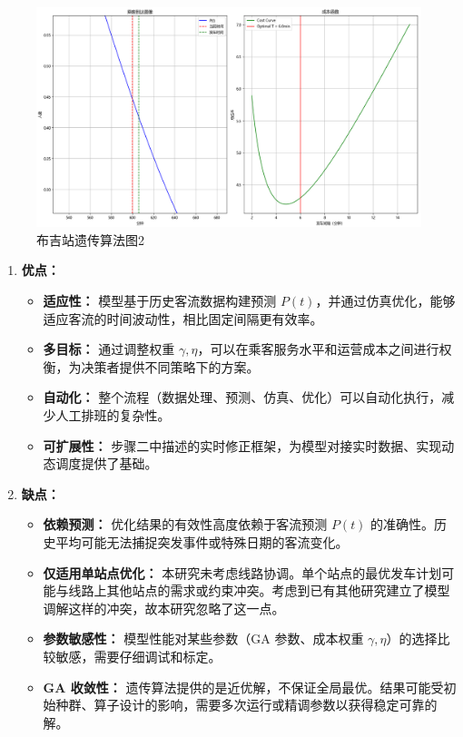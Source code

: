 \begin{figure}[htbp]
    \centering
    \includegraphics[width=1.0\textwidth]{res/Figure_8.png}
    \caption{布吉站遗传算法图2}
    \label{fig:gaBuji2}
\end{figure}


\begin{enumerate}
    \item \textbf{优点：}
        \begin{itemize}
            \item \textbf{适应性：} 模型基于历史客流数据构建预测 $P(t)$，并通过仿真优化，能够适应客流的时间波动性，相比固定间隔更有效率。
            \item \textbf{多目标：} 通过调整权重 $\gamma, \eta$，可以在乘客服务水平和运营成本之间进行权衡，为决策者提供不同策略下的方案。
            \item \textbf{自动化：} 整个流程（数据处理、预测、仿真、优化）可以自动化执行，减少人工排班的复杂性。
            \item \textbf{可扩展性：} 步骤二中描述的实时修正框架，为模型对接实时数据、实现动态调度提供了基础。
        \end{itemize}
    \item \textbf{缺点：}
        \begin{itemize}
            \item \textbf{依赖预测：} 优化结果的有效性高度依赖于客流预测 $P(t)$ 的准确性。历史平均可能无法捕捉突发事件或特殊日期的客流变化。
            \item \textbf{仅适用单站点优化：} 本研究未考虑线路协调。单个站点的最优发车计划可能与线路上其他站点的需求或约束冲突。考虑到已有其他研究建立了模型调解这样的冲突，故本研究忽略了这一点。
            \item \textbf{参数敏感性：} 模型性能对某些参数（GA 参数、成本权重 $\gamma, \eta$）的选择比较敏感，需要仔细调试和标定。
            \item \textbf{GA 收敛性：} 遗传算法提供的是近优解，不保证全局最优。结果可能受初始种群、算子设计的影响，需要多次运行或精调参数以获得稳定可靠的解。
        \end{itemize}
\end{enumerate}


